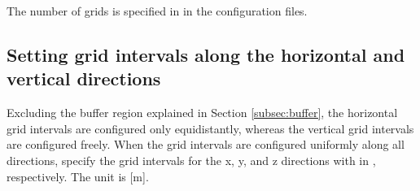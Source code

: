 The number of grids is specified in  in the configuration files.

\subsection{Setting grid intervals along the horizontal and vertical directions} \label{subsec:gridinterv}

Excluding the buffer region explained in Section \ref{subsec:buffer}, the horizontal grid intervals are configured only equidistantly, whereas the vertical grid intervals are configured freely.
When the grid intervals are configured uniformly along all directions, specify the grid intervals for the x, y, and z directions with  in , respectively.
The unit is [m].

